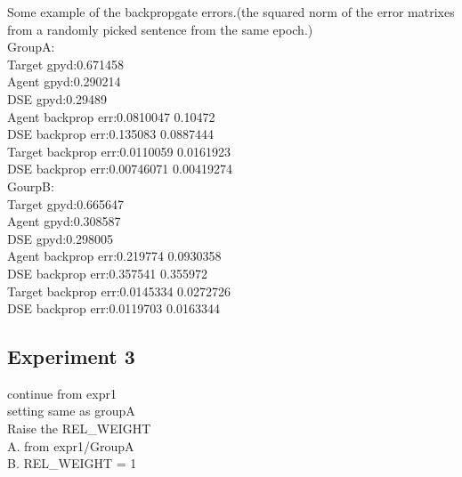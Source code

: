 \documentclass[a4paper, 12pt]{article}
\begin{document}
Some example of the backpropgate errors.(the squared norm of the error
matrixes from a randomly picked sentence from the same epoch.)\\
GroupA:\\
Target gpyd:0.671458\\
Agent gpyd:0.290214\\
DSE gpyd:0.29489\\
Agent backprop err:0.0810047 0.10472\\
DSE backprop err:0.135083 0.0887444\\
Target backprop err:0.0110059 0.0161923\\
DSE backprop err:0.00746071 0.00419274\\
GourpB:\\
Target gpyd:0.665647\\
Agent gpyd:0.308587\\
DSE gpyd:0.298005\\
Agent backprop err:0.219774 0.0930358\\
DSE backprop err:0.357541 0.355972\\
Target backprop err:0.0145334 0.0272726\\
DSE backprop err:0.0119703 0.0163344\\

\subsection{Experiment 3}
continue from expr1\\
setting same as groupA\\
Raise the REL\_WEIGHT\\
A. from expr1/GroupA\\
B. REL\_WEIGHT = 1\\
\end{document}
